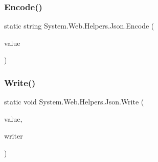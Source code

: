 \subsubsection{\texorpdfstring{Encode()}{Encode()}}
{\footnotesize\ttfamily static string System.\+Web.\+Helpers.\+Json.\+Encode (\begin{DoxyParamCaption}\item[{object}]{value }\end{DoxyParamCaption})\hspace{0.3cm}{\ttfamily [static]}}

\mbox{\label{classSystem_1_1Web_1_1Helpers_1_1Json_a461c4677a0c7755a390cbe247d2cb106}} 
\subsubsection{\texorpdfstring{Write()}{Write()}}
{\footnotesize\ttfamily static void System.\+Web.\+Helpers.\+Json.\+Write (\begin{DoxyParamCaption}\item[{object}]{value,  }\item[{Text\+Writer}]{writer }\end{DoxyParamCaption})\hspace{0.3cm}{\ttfamily [static]}}

